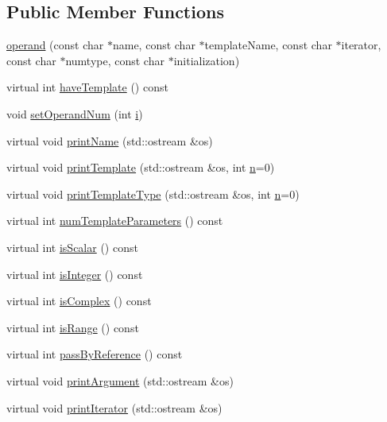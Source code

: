 \subsection*{Public Member Functions}
\begin{DoxyCompactItemize}
\item 
\hyperlink{classoperand_ae9f2789d0609256855513169dce012d6}{operand} (const char $\ast$name, const char $\ast$template\+Name, const char $\ast$iterator, const char $\ast$numtype, const char $\ast$initialization)
\item 
virtual int \hyperlink{classoperand_a0ba3fd7b3d6ac30f56d7a2cb70db26ac}{have\+Template} () const 
\item 
void \hyperlink{classoperand_a66ff35e04a35c55365cf3f66c91c35bc}{set\+Operand\+Num} (int \hyperlink{indexexpr_8h_aabd77643995707c185e95c8cb2782c81}{i})
\item 
virtual void \hyperlink{classoperand_a545a620f7480eda1870b682db31549c5}{print\+Name} (std\+::ostream \&os)
\item 
virtual void \hyperlink{classoperand_a7397afe3ce1eb390538f8067016e647a}{print\+Template} (std\+::ostream \&os, int \hyperlink{indexexpr_8h_ab427e2e2b4d6cec55fa088ea2a692ace}{n}=0)
\item 
virtual void \hyperlink{classoperand_ac115fcfedc902b68a278d5534194d10c}{print\+Template\+Type} (std\+::ostream \&os, int \hyperlink{indexexpr_8h_ab427e2e2b4d6cec55fa088ea2a692ace}{n}=0)
\item 
virtual int \hyperlink{classoperand_a91ff6c58f389af7fc8fc3369082ac4f3}{num\+Template\+Parameters} () const 
\item 
virtual int \hyperlink{classoperand_a9e65861efe7c442d2f032baa3840d13f}{is\+Scalar} () const 
\item 
virtual int \hyperlink{classoperand_aa81da7b3d80163c272f5fc7f3b6add41}{is\+Integer} () const 
\item 
virtual int \hyperlink{classoperand_af0f978cfd828f6636146f28553f82cc9}{is\+Complex} () const 
\item 
virtual int \hyperlink{classoperand_a7ae257ace8e03d854ba5bad78fda1600}{is\+Range} () const 
\item 
virtual int \hyperlink{classoperand_ad3516379bc856361263ef466e02e59ad}{pass\+By\+Reference} () const 
\item 
virtual void \hyperlink{classoperand_a99d1c405e77755f64774c283aace308c}{print\+Argument} (std\+::ostream \&os)
\item 
virtual void \hyperlink{classoperand_ab378b65a23f67d3d3d7036e8ad749e3e}{print\+Iterator} (std\+::ostream \&os)

\end{DoxyCompactItemize}
